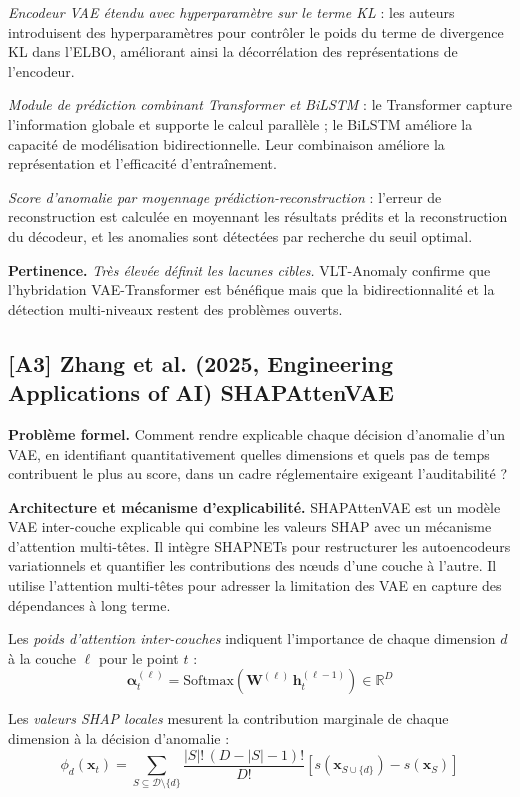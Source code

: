 \documentclass[12pt,a4paper]{article}
\begin{document}
\textit{Encodeur VAE étendu avec hyperparamètre sur le terme KL} : les auteurs introduisent des hyperparamètres pour contrôler le poids du terme de divergence KL dans l'ELBO, améliorant ainsi la décorrélation des représentations de l'encodeur.

\textit{Module de prédiction combinant Transformer et BiLSTM} : le Transformer capture l'information globale et supporte le calcul parallèle ; le BiLSTM améliore la capacité de modélisation bidirectionnelle. Leur combinaison améliore la représentation et l'efficacité d'entraînement.

\textit{Score d'anomalie par moyennage prédiction-reconstruction} : l'erreur de reconstruction est calculée en moyennant les résultats prédits et la reconstruction du décodeur, et les anomalies sont détectées par recherche du seuil optimal.

\textbf{Pertinence.} \textit{Très élevée  définit les lacunes cibles.} VLT-Anomaly confirme que l'hybridation VAE-Transformer est bénéfique mais que la bidirectionnalité et la détection multi-niveaux restent des problèmes ouverts.

\subsection{[A3] Zhang et al. (2025, Engineering Applications of AI)  SHAPAttenVAE}

\textbf{Problème formel.} Comment rendre explicable chaque décision d'anomalie d'un VAE, en identifiant quantitativement quelles dimensions et quels pas de temps contribuent le plus au score, dans un cadre réglementaire exigeant l'auditabilité ?

\textbf{Architecture et mécanisme d'explicabilité.} SHAPAttenVAE est un modèle VAE inter-couche explicable qui combine les valeurs SHAP avec un mécanisme d'attention multi-têtes. Il intègre SHAPNETs pour restructurer les autoencodeurs variationnels et quantifier les contributions des nœuds d'une couche à l'autre. Il utilise l'attention multi-têtes pour adresser la limitation des VAE en capture des dépendances à long terme.

Les \textit{poids d'attention inter-couches} indiquent l'importance de chaque dimension $d$ à la couche $\ell$ pour le point $t$ :
$$\boldsymbol{\alpha}^{(\ell)}_t = \mathrm{Softmax}(\mathbf{W}^{(\ell)}\,\mathbf{h}^{(\ell-1)}_t) \in \mathbb{R}^D$$

Les \textit{valeurs SHAP locales} mesurent la contribution marginale de chaque dimension à la décision d'anomalie :
$$\phi_d(\mathbf{x}_t) = \sum_{S \subseteq \mathcal{D}\setminus\{d\}}\frac{|S|!\,(D-|S|-1)!}{D!}\left[s(\mathbf{x}_{S\cup\{d\}}) - s(\mathbf{x}_S)\right]$$
\end{document}
